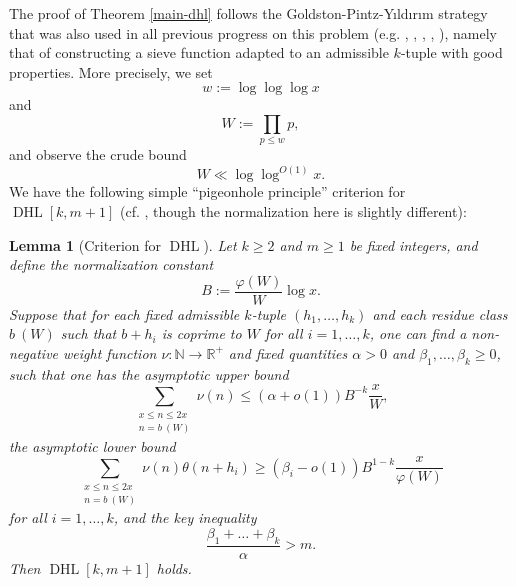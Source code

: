 \documentclass{bmcart}
\DeclareMathOperator*\DHL{DHL}
\theoremstyle{plain}
\newtheorem{lemma}[theorem]{Lemma}
\theoremstyle{definition}
\newcommand\R{\mathbb{R}}
\newcommand\N{\mathbb{N}}
\renewcommand{\phi}{\varphi}
\begin{document}
The proof of Theorem \ref{main-dhl} follows the Goldston-Pintz-Y{\i}ld{\i}r{\i}m strategy that was also used in all previous progress on this problem (e.g. \cite{gpy}, \cite{mp}, \cite{zhang}, \cite{polymath8a}, \cite{maynard-new}), namely that of constructing a sieve function adapted to an admissible $k$-tuple with good properties.  More precisely, we set
$$ w := \log \log \log x$$
and 
$$ W := \prod_{p \leq w} p,$$
and observe the crude bound
\begin{equation}\label{W-bound}
 W \ll \log \log^{O(1)} x.
\end{equation}
We have the following simple ``pigeonhole principle'' criterion for $\DHL[k,m+1]$ (cf. \cite[Lemma 4.1]{polymath8a}, though the normalization here is slightly different):

\begin{lemma}[Criterion for $\DHL$]\label{crit} Let $k \geq 2$ and $m \geq 1$ be fixed integers, and define the normalization constant
\begin{equation}\label{bnorm}
 B := \frac{\phi(W)}{W} \log x.
\end{equation}
Suppose that for each fixed admissible $k$-tuple $(h_1,\dots,h_k)$
  and each residue class $b\ (W)$ such that $b+h_i$ is coprime to $W$ for all $i=1,\dots,k$, one can find a non-negative weight
  function $\nu \colon \N \to \R^+$ and fixed quantities $\alpha > 0$ and $\beta_1,\dots,\beta_k \geq
  0$, such that one has the
  asymptotic upper bound
\begin{equation}\label{s1}
 \sum_{\substack{x \leq n \leq 2x\\ n = b\ (W)}} \nu(n) \leq (\alpha+o(1)) B^{-k} \frac{x}{W},
 \end{equation}
the asymptotic lower bound
\begin{equation}\label{s2}
  \sum_{\substack{x \leq n \leq 2x\\ n = b\ (W)}} \nu(n) \theta(n+h_i) \geq (\beta_i-o(1)) B^{1-k} \frac{x}{\phi(W)}
\end{equation}
for all $i=1,\dots,k$, and the key inequality
\begin{equation}\label{key}
\frac{\beta_1 + \dots + \beta_k}{\alpha} > m.
\end{equation}
Then $\DHL[k,m+1]$ holds.
\end{lemma}
\end{document}
